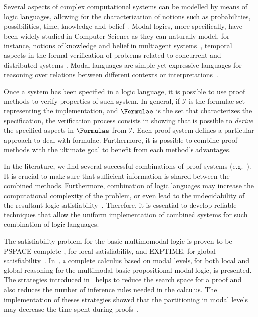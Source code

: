 Several aspects of complex computational systems can be modelled by means of
logic languages, allowing for the characterization of notions such as
probabilities, possibilities, time, knowledge and
belief~\cite{FHMV95,Hai82,HMM83,rao:91c}. Modal logics, more specifically, have
been widely studied in Computer Science as they can naturally model, for
instance, notions of knowledge and belief in multiagent
systems~\cite{bratman1987intention,FHMV95,rao:91c}, temporal aspects in the
formal verification of problems related to concurrent and distributed
systems~\cite{Hai82,HMM83}. Modal languages are simple yet expressive languages
for reasoning over relations between different contexts or
interpretations~\cite{blackburn2002modal}.

Once a system has been specified in a logic language, it is possible to use
proof methods to verify properties of such system. In general, if $\mathcal{I}$
is the formulae set representing the implementation, and $\Formulae$ is the set
that characterizes the specification, the verification process consists in
showing that is possible to \emph{derive} the specified aspects in $\Formulae$
from $\mathcal{I}$. Each proof system defines a particular approach to deal with
formulae. Furthermore, it is possible to combine proof methods with the ultimate
goal to benefit from each method's advantages. 

In the literature, we find several successful combinations of proof systems
(e.g.~\cite{hylores, ghilardi2017interpolation,
Goetzmann+Kaminski+Smolka@ENTCS2010, gutierrez2016metric}). It is crucial to
make sure that sufficient information is shared between the combined methods.
Furthermore, combination of logic languages may increase the computational
complexity of the problem, or even lead to the undecidability of the resultant
logic satisfiability~\cite{mdml}. Therefore, it is essential to develop
reliable techniques that allow the uniform implementation of combined systems
for such combination of logic languages.

The satisfiability problem for the basic multimomodal logic is proven to be
PSPACE-complete~\cite{Spaan:coml}, for local satisfiability, and EXPTIME, for
global satisfiability~\cite{Spaan:coml}. In~\cite{nalon2015modal}, a complete
calculus based on modal levels, for both local and global reasoning for the
multimodal basic propositional modal logic, is presented. The strategies
introduced in~\cite{nalon2015modal} helps to reduce the search space for a proof
and also reduces the number of inference rules needed in the calculus. The
implementation of theses strategies showed that the partitioning in modal levels
may decrease the time spent during proofs~\cite{Nalon2016}. 

